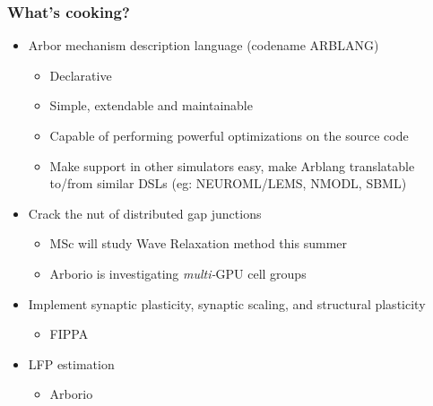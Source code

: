 \documentclass[t]{beamer}
\begin{document}
\begin{frame}
    \frametitle{What's cooking?}
    \begin{itemize}
    \item Arbor mechanism description language (codename ARBLANG)
    \begin{itemize}
    \item Declarative
    \item Simple, extendable and maintainable
    \item Capable of performing powerful optimizations on the source code
    \item Make support in other simulators easy, make Arblang translatable to/from similar DSLs (eg: NEUROML/LEMS, NMODL, SBML)
    \end{itemize}
    \item Crack the nut of distributed gap junctions
    \begin{itemize}
    \item MSc will study Wave Relaxation method this summer
    \item Arborio is investigating \textit{multi-}GPU cell groups
    \end{itemize}
    \item Implement synaptic plasticity, synaptic scaling, and structural plasticity
    \begin{itemize}
    \item FIPPA
    \end{itemize}
    \item LFP estimation
    \begin{itemize}
    \item Arborio
    \end{itemize}
    \end{itemize}
\end{frame}
\end{document}
